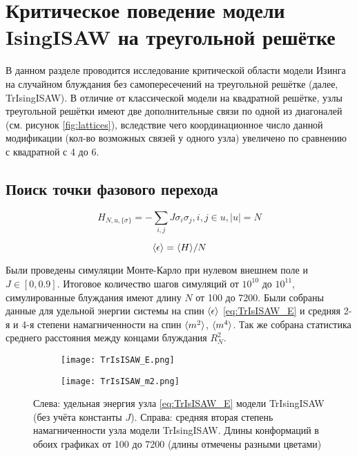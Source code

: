 \section{Критическое поведение модели IsingISAW на треугольной решётке}

В данном разделе проводится исследование критической области модели Изинга на случайном блуждания без самопересечений на треугольной решётке (далее, TrIsingISAW).
В отличие от классической модели на квадратной решётке, узлы треугольной решётки имеют две дополнительные связи по одной из диагоналей (см. рисунок \ref{fig:lattices}), 
вследствие чего координационное число данной модификации (кол-во возможных связей у одного узла) увеличено по сравнению с квадратной с 4 до 6.

\subsection{Поиск точки фазового перехода}

\begin{equation}
\label{eq:IsISAW_H}
 H_{N,u,\{\sigma\}} = -\sum_{i,j} J\sigma_i \sigma_j, i,j \in u, |u| = N
\end{equation}

\begin{equation}
\label{eq:TrIsISAW_E}
\langle \epsilon \rangle = \langle H \rangle / N
\end{equation}

Были проведены симуляции Монте-Карло при нулевом внешнем поле и $J \in [0,0.9]$. 
Итоговое количество шагов симуляций от $10^10$ до $10^11$, симулированные блуждания имеют длину $N$ от 100 до 7200.
Были собраны данные для удельной энергии системы на спин $\langle \epsilon \rangle$ \eqref{eq:TrIsISAW_E} и средняя 2-я и 4-я степени намагниченности на спин $\langle m^2 \rangle$, $\langle m^4 \rangle$.
Так же собрана статистика среднего расстояния между концами блуждания $R^2_N$.

\begin{figure}[h]
\begin{subfigure}{0.49\textwidth}
\texttt{[image: TrIsISAW\_E.png]}
\end{subfigure}
\hfill
\begin{subfigure}{0.49\textwidth}
\texttt{[image: TrIsISAW\_m2.png]}
\end{subfigure}
\caption{Слева: удельная энергия узла \eqref{eq:TrIsISAW_E} модели TrIsingISAW (без учёта константы $J$). Справа: средняя вторая степень намагниченности узла модели TrIsingISAW. Длины конформаций в обоих графиках от 100 до 7200 (длины отмечены разными цветами)}
\label{fig:TrIsISAW_E}
\end{figure}

